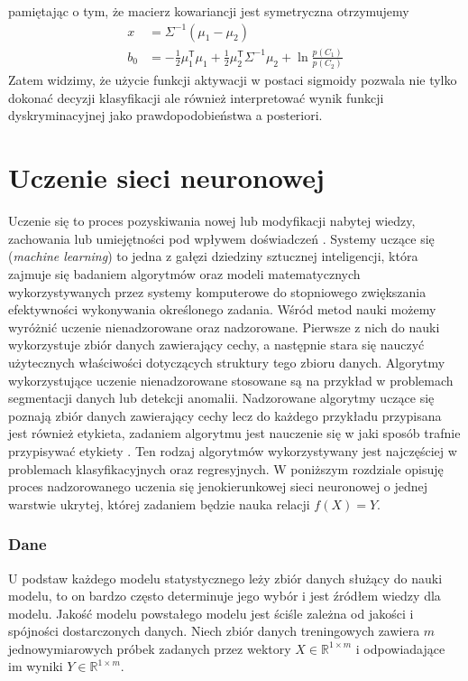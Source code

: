 \documentclass[11pt]{book}
\theoremstyle{definition}
\begin{document}
%
pamiętając o tym, że macierz kowariancji jest symetryczna otrzymujemy
%
\begin{subequations}
	\begin{align}
	x &= \Sigma^{-1} \left(\mu_1 - \mu_2\right)\\
	b_0 &= - \frac{1}{2} \mu_1^\mathsf{T}\mu_1 + \frac{1}{2} \mu_2^\mathsf{T} \Sigma^{-1} \mu_2 + \ln \frac{p(C_1)}{p(C_2)}
	\end{align}
\end{subequations}
%
Zatem widzimy, że użycie funkcji aktywacji w postaci sigmoidy pozwala nie tylko dokonać decyzji klasyfikacji ale również interpretować wynik funkcji dyskryminacyjnej jako prawdopodobieństwa a posteriori.
%


\section{Uczenie sieci neuronowej}
\label{backprop}

Uczenie się to proces pozyskiwania nowej lub modyfikacji nabytej wiedzy, zachowania lub umiejętności pod wpływem doświadczeń \cite{2008:Biologia}. Systemy uczące się (\textit{machine learning}) to jedna z gałęzi dziedziny sztucznej inteligencji, która zajmuje się badaniem algorytmów oraz modeli matematycznych wykorzystywanych przez systemy komputerowe do stopniowego zwiększania efektywności wykonywania określonego zadania. Wśród metod nauki możemy wyróżnić uczenie nienadzorowane oraz nadzorowane. Pierwsze z nich do nauki wykorzystuje zbiór danych zawierający cechy, a następnie stara się nauczyć użytecznych właściwości dotyczących struktury tego zbioru danych. Algorytmy wykorzystujące uczenie nienadzorowane stosowane są na przykład w problemach segmentacji danych lub detekcji anomalii. Nadzorowane algorytmy uczące się poznają zbiór danych zawierający cechy lecz do każdego przykładu przypisana jest również etykieta, zadaniem algorytmu jest nauczenie się w jaki sposób trafnie przypisywać etykiety \cite{Goodfellow-et-al-2016}. Ten rodzaj algorytmów wykorzystywany jest najczęściej w problemach klasyfikacyjnych oraz regresyjnych. W poniższym rozdziale opisuję proces nadzorowanego uczenia się jenokierunkowej sieci neuronowej o jednej warstwie ukrytej, której zadaniem będzie nauka relacji $f(X)  = Y$.


\subsubsection{Dane}

U podstaw każdego modelu statystycznego leży zbiór danych służący do nauki modelu, to on bardzo często determinuje jego wybór i jest źródłem wiedzy dla modelu. Jakość modelu powstałego modelu jest ściśle zależna od jakości i spójności dostarczonych danych. Niech zbiór danych treningowych zawiera $m$ jednowymiarowych próbek zadanych przez wektory $X \in \mathbb{R}^{1\times m}$ i odpowiadające im wyniki $Y\in \mathbb{R}^{1\times m}$.
\end{document}
